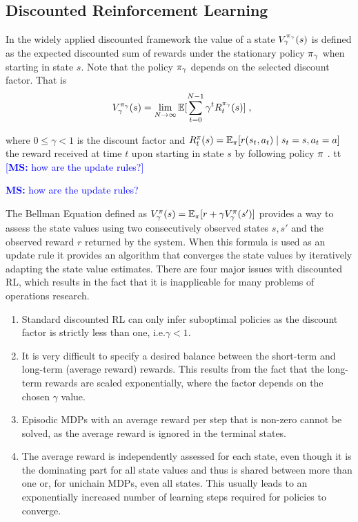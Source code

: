 \documentclass[envcountsame]{llncs}
\newcommand\MS[2][r]{\ifx t#1 \textcolor{blue}{[\textbf{MS:} #2]}
  \else \begin{center}\textcolor{blue}{\textbf{MS:} #2} \end{center} \fi}
\begin{document}
\subsection{Discounted Reinforcement Learning}
\label{subsec:Discounted_Reinforcement_Learning}


In the widely applied discounted framework the value of a state \(V_{\gamma}^{\pi_{\gamma}}(s)\) is
defined as the expected discounted sum of rewards under the stationary policy \(\pi_{\gamma}\) when
starting in state \(s\). Note that the policy \(\pi_{\gamma}\) depends on the selected discount
factor. That is
\begin{align*}
  V_{\gamma}^{\pol_{\gamma}}(s)=\lim_{N \to \infty} \E[\sum_{t=0}^{N-1} \gamma^{t} R_{t}^{\pol_{\gamma}}(s)]\tcom
\end{align*}

where \(0 \leqslant \gamma < 1\) is the discount factor and
\(R_{t}^{\pi}(s) = \operatorname*{\mathbb{E}}_{\pi}[ r(s_{t},a_{t}) \mid s_{t} = s, a_{t} = a]\) the reward received at
time \(t\) upon starting in state \(s\) by following policy \(\pi\)
\citep{Mahadevan96_AverageRewardReinforcementLearningFoundationsAlgorithmsAndEmpiricalResults}.
\MS[t]{how are the update rules?}

The Bellman Equation defined as
\(V_{\gamma}^{\pi}(s) = \operatorname*{\mathbb{E}}_{\pi}[r + \gamma V_{\gamma}^{\pi}(s')]\) \citep[see
e.g.][p.70]{sutton1998introduction} provides a way to assess the state values using two
consecutively observed states \(s, s'\) and the observed reward \(r\) returned by the system. When
this formula is used as an update rule it provides an algorithm that converges the state values by
iteratively adapting the state value estimates.
%
There are four major issues with discounted RL, which results in the fact that it is inapplicable
for many problems of operations research.


\begin{enumerate}
\item Standard discounted RL can only infer suboptimal policies as the discount factor is strictly
  less than one, i.e.\@ \(\gamma < 1\).
\item It is very difficult to specify a desired balance between the short-term and long-term
  (average reward) rewards. This results from the fact that the long-term rewards are scaled
  exponentially, where the factor depends on the chosen \(\gamma\) value.
\item Episodic MDPs with an average reward per step that is non-zero cannot be solved, as the
  average reward is ignored in the terminal states.
\item The average reward is independently assessed for each state, even though it is the dominating
  part for all state values and thus is shared between more than one or, for unichain MDPs, even all
  states. This usually leads to an exponentially increased number of learning steps required for
  policies to converge.
\end{enumerate}
\end{document}
